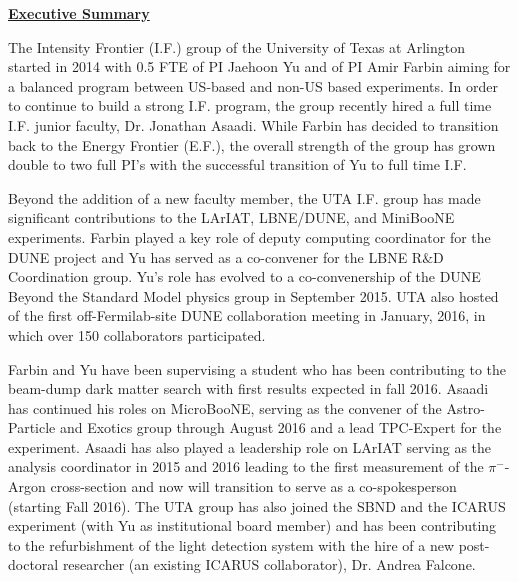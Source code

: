 
\begin{center}
\textbf{\Large\underline{Executive Summary} }
\end{center}

The Intensity Frontier (I.F.) group of the University of Texas at Arlington started in 2014 with 0.5 FTE of PI Jaehoon Yu and of PI Amir Farbin aiming for a balanced program between US-based and non-US based experiments. In order to continue to build a strong I.F. program, the group recently hired a full time I.F. junior faculty, Dr. Jonathan Asaadi. While Farbin has decided to transition back to the Energy Frontier (E.F.), the overall strength of the group has grown double to two full PI's with the successful transition of Yu to full time I.F.

Beyond the addition of a new faculty member, the UTA I.F. group has made significant contributions to the LArIAT, LBNE/DUNE, and MiniBooNE experiments. Farbin played a key role of deputy computing coordinator for the DUNE project and Yu has served as a co-convener for the LBNE R$\&$D Coordination group. Yu's role has evolved to a co-convenership of the DUNE Beyond the Standard Model physics group in September 2015. UTA also hosted of the first off-Fermilab-site DUNE collaboration meeting in January, 2016, in which over 150 collaborators participated. 

Farbin and Yu have been supervising a student who has been contributing to the beam-dump dark matter search with first results expected in fall 2016. Asaadi has continued his roles on MicroBooNE, serving as the convener of the Astro-Particle and Exotics group through August 2016 and a lead TPC-Expert for the experiment. Asaadi has also played a leadership role on LArIAT serving as the analysis coordinator in 2015 and 2016 leading to the first measurement of the $\pi^{-}$-Argon cross-section and now will transition to serve as a co-spokesperson (starting Fall 2016). The UTA group has also joined the SBND and the ICARUS experiment (with Yu as institutional board member) and has been contributing to the refurbishment of the light detection system with the hire of a new post-doctoral researcher (an existing ICARUS collaborator), Dr. Andrea Falcone.

